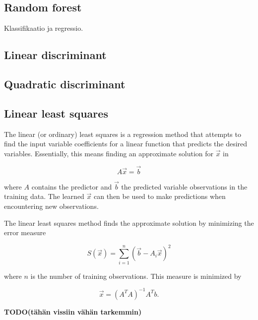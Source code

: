 \documentclass[twoside]{article}
\newcommand{\todo}[1]{\textbf{TODO(#1)}}
\renewcommand{\v}[1]{\vec{#1}}
\begin{document}
\begin{multicols}{2}
\subsection{Random forest}

Klassifikaatio ja regressio.

\subsection{Linear discriminant}

\subsection{Quadratic discriminant}

\subsection{Linear least squares}

The linear (or ordinary) least squares is a regression method that attempts to
find the input variable coefficients for a linear function that predicts the desired variables.
Essentially, this means finding an approximate solution for $\v{x}$ in

\begin{equation*}
 A\v{x} = \v{b}
\end{equation*}

where $A$ contains the predictor and $\v{b}$ the predicted variable observations
in the training data. The learned $\v{x}$ can then be used to make predictions when encountering
new observations.

The linear least squares method finds the approximate solution by minimizing the error measure

\begin{equation}
 S(\v{x}) = \sum_{i=1}^n (\v{b} - A_i \v{x})^2
\end{equation}

where $n$ is the number of training observations. This measure is minimized by

\begin{equation}
 \v{x} = (A^T A)^{-1} A^T b.
\end{equation}

\todo{tähän vissiin vähän tarkemmin}



\end{multicols}
\end{document}
